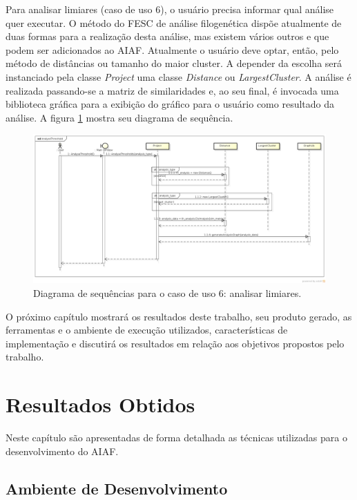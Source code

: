 Para analisar limiares (caso de uso 6),
o usuário precisa informar qual análise quer executar. O método do FESC de análise filogenética dispõe atualmente de duas formas
para a realização desta análise, mas existem vários outros e que podem ser adicionados ao AIAF. Atualmente o usuário deve optar, então, pelo método de
distâncias ou tamanho do maior cluster. A depender da escolha será instanciado pela classe \textit{Project} uma classe \textit{Distance} ou
\textit{LargestCluster}. A análise é realizada passando-se a matriz de similaridades e, ao seu final, é invocada uma biblioteca gráfica
para a exibição do gráfico para o usuário como resultado da análise. A figura \ref{fig:analyse-threshold} mostra seu diagrama de sequência.

\begin{figure}
\centering
\includegraphics[scale=0.34]{analyse-threshold}
\caption{Diagrama de sequências para o caso de uso 6: analisar limiares.}
\label{fig:analyse-threshold}
\end{figure}

O próximo capítulo mostrará os resultados deste trabalho, seu produto gerado, as ferramentas e o ambiente de execução utilizados, características
de implementação e discutirá os resultados em relação aos objetivos propostos pelo trabalho.

\chapter{Resultados Obtidos}
\label{cap:resultados}

Neste capítulo são apresentadas de forma detalhada as técnicas utilizadas para o desenvolvimento do AIAF.


\section{Ambiente de Desenvolvimento} \label{sec:ambiente}


